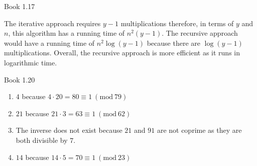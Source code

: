 \documentclass[boxes]{rutgers_hw}
\newcommand{\Mod}[1]{\ (\mathrm{mod}\ #1)}
\begin{document}
\begin{exern}{7}
    Book 1.17
\end{exern}
\begin{solution}
    The iterative approach requires $y-1$ multiplications therefore, in terms of $y$ and $n$, this algorithm has a running time of $n^2(y-1)$. The recursive approach would have a running time of $n^2\log(y-1)$ because there are $\log(y-1)$ multiplications. Overall, the recursive approach is more efficient as it runs in logarithmic time.  
\end{solution}

\pagebreak

\begin{exern}{8}
    Book 1.20
\end{exern}
\begin{solution}
    \hfill
    \begin{enumerate}
        \item $4$ because $4 \cdot 20 = 80 \equiv 1 \Mod {79}$ 
        \item $21$ because $21 \cdot 3 = 63 \equiv 1 \Mod {62}$
        \item The inverse does not exist because $21$ and $91$ are not coprime as they are both divisible by $7$.
        \item $14$ because $14 \cdot 5 = 70 \equiv 1 \Mod {23}$
    \end{enumerate}
\end{solution}
\end{document}
